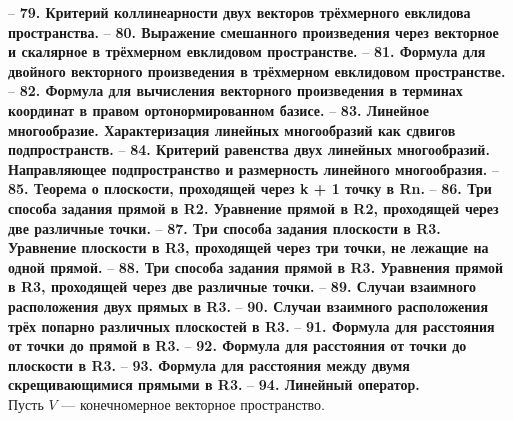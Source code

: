 \documentclass{article}
\begin{document}
--
\newline
\newline
\textbf{79. Критерий коллинеарности двух векторов трёхмерного евклидова пространства.}
--
\newline
\newline
\textbf{80. Выражение смешанного произведения через векторное и скалярное в трёхмерном евклидовом пространстве.}
--
\newline
\newline
\textbf{81. Формула для двойного векторного произведения в трёхмерном евклидовом пространстве.
}
--
\newline
\newline
\textbf{82. Формула для вычисления векторного произведения в терминах координат в правом ортонормированном базисе.}
--
\newline
\newline
\textbf{83. Линейное многообразие. Характеризация линейных многообразий как сдвигов подпространств.}
--
\newline
\newline
\textbf{84. Критерий равенства двух линейных многообразий. Направляющее подпространство и размерность линейного
многообразия.}
--
\newline
\newline
\textbf{85. Теорема о плоскости, проходящей через k + 1 точку в Rn.}
--
\newline
\newline
\textbf{86. Три способа задания прямой в R2. Уравнение прямой в R2, проходящей через две различные точки.}
--
\newline
\newline
\textbf{87. Три способа задания плоскости в R3. Уравнение плоскости в R3, проходящей через три точки, не лежащие на
одной прямой.}
--
\newline
\newline
\textbf{88. Три способа задания прямой в R3. Уравнения прямой в R3, проходящей через две различные точки.}
--
\newline
\newline
\textbf{89. Случаи взаимного расположения двух прямых в R3.}
--
\newline
\newline
\textbf{90. Случаи взаимного расположения трёх попарно различных плоскостей в R3.}
--
\newline
\newline
\textbf{91. Формула для расстояния от точки до прямой в R3.}
--
\newline
\newline
\textbf{92. Формула для расстояния от точки до плоскости в R3.}
--
\newline
\newline
\textbf{93. Формула для расстояния между двумя скрещивающимися прямыми в R3.}
--
\newline
\newline
\textbf{94. Линейный оператор.}\\
Пусть $V$ --- конечномерное векторное пространство.
\end{document}
